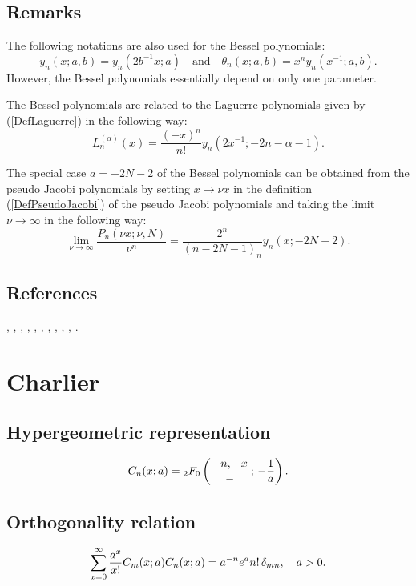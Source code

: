 \documentclass[envcountchap,graybox]{svmono}
\newcounter{rom}
\newcommand{\hyp}[5]{\mbox{}_{#1}{F}_{#2}
\left(\genfrac{}{}{0pt}{}{#3}{#4}\,;\,#5\right)}
\begin{document}
\subsection*{Remarks}
The following notations are also used for the Bessel polynomials:
$$y_n(x;a,b)=y_n(2b^{-1}x;a)\quad\textrm{and}\quad\theta_n(x;a,b)=x^ny_n(x^{-1};a,b).$$
However, the Bessel polynomials essentially depend on only one parameter.

\noindent
The Bessel polynomials are related to the Laguerre polynomials given by (\ref{DefLaguerre})
in the following way:
$$L_n^{(\alpha)}(x)=\frac{(-x)^n}{n!}y_n(2x^{-1};-2n-\alpha-1).$$

\noindent
The special case $a=-2N-2$ of the Bessel polynomials can be obtained from the pseudo Jacobi
polynomials by setting $x\rightarrow\nu x$ in the definition (\ref{DefPseudoJacobi}) of the
pseudo Jacobi polynomials and taking the limit $\nu\rightarrow\infty$ in the following way:
$$\lim\limits_{\nu\rightarrow\infty}\frac{P_n(\nu x;\nu,N)}{\nu^n}
=\frac{2^n}{(n-2N-1)_n}y_n(x;-2N-2).$$

\subsection*{References}
\cite{Andrade}, \cite{BergVignat}, \cite{Carlitz57I}, \cite{Dattoli2003},
\cite{DohaAhmed2004}, \cite{DohaAhmed2006}, \cite{Grosswald}, \cite{Ismail2005II},
\cite{KrallFrink}, \cite{Lesky98}, \cite{NikiforovUvarov}.


\section{Charlier}

\par\setcounter{equation}{0}

\subsection*{Hypergeometric representation}
\begin{equation}
\label{DefCharlier}
C_n(x;a)=\hyp{2}{0}{-n,-x}{-}{-\frac{1}{a}}.
\end{equation}

\subsection*{Orthogonality relation}
\begin{equation}
\label{OrtCharlier}
\sum_{x=0}^{\infty}\frac{a^x}{x!}C_m(x;a)C_n(x;a)=
a^{-n}{e}^an!\,\delta_{mn},\quad a > 0.
\end{equation}
\end{document}
